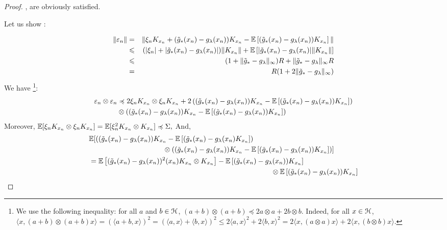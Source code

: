 \begin{proof}
,  are obviously satisfied.

Let us show :

\begin{eqnarray*}
\|\varepsilon_n\| &=& \| \xi_n K_{x_n}   +   (\tilde{g}_*(x_n)- g_\lambda(x_n)) K_{x_n} - {\mathbb E} \left[ (\tilde{g}_*(x_n)- g_\lambda(x_n)) K_{x_n} \right] \| \\
&\leqslant& (|\xi_n| + |\tilde{g}_*(x_n)- g_\lambda(x_n)|) \|K_{x_n} \|+  {\mathbb E} \left[ |\tilde{g}_*(x_n)- g_\lambda(x_n)| \|K_{x_n}\| \right]\\
&\leqslant& (1+\|\tilde{g}_*- g_\lambda\|_\infty) R +  \|\tilde{g}_*- g_\lambda\|_\infty R  \\
&=& R(1+2 \|\tilde{g}_*- g_\lambda\|_\infty) 
\end{eqnarray*}
We have \footnote{We use the following inequality: for all $a$ and $b \in {\mathcal H}$, $(a+b) \otimes (a+b) \preccurlyeq 2 a \otimes a + 2 b \otimes b$. Indeed, for all $x \in {\mathcal H}$, $\langle x, (a+b) \otimes (a+b) x\rangle  =  (\langle a +  b , x\rangle)^2 = (\langle a,x\rangle +  \langle b , x\rangle)^2 \leqslant 2 \langle a,x \rangle^2 + 2 \langle b , x \rangle^2 = 2 \langle x, (a \otimes a) x \rangle + 2 \langle x, (b \otimes b) x \rangle $.}:
\begin{align*}
\varepsilon_n \otimes \varepsilon_n  &\preccurlyeq  2 \xi_n K_{x_n} \otimes \xi_n K_{x_n} +  2\left((\tilde{g}_*(x_n)- g_\lambda(x_n)) K_{x_n} - {\mathbb E} \left[ (\tilde{g}_*(x_n)- g_\lambda(x_n)) K_{x_n} \right]\right)   \\ 
& \otimes \left((\tilde{g}_*(x_n)- g_\lambda(x_n)) K_{x_n} - {\mathbb E} \left[ (\tilde{g}_*(x_n)- g_\lambda(x_n)) K_{x_n} \right]\right)
\end{align*}
Moreover, ${\mathbb E} [\xi_n K_{x_n} \otimes \xi_n K_{x_n}] = {\mathbb E} [\xi_n^2 K_{x_n} \otimes K_{x_n}] \preccurlyeq \Sigma ,$
And,
\begin{align*}
& \E[((\Phg(x_n)- g_\lambda(x_n) )K_{x_n} - \E \left[ (\Phg(x_n)- g_\lambda(x_n) K_{x_n} \right]) \\
& \hspace{3.66cm}\otimes ((\Phg(x_n)- g_\lambda(x_n)) K_{x_n} - \E \left[ (\Phg(x_n)- g_\lambda(x_n)) K_{x_n} \right])] \\
&= \E \left[ (\Phg(x_n)- g_\lambda(x_n))^2(x_n) K_{x_n} \otimes K_{x_n} \right] - \E \left[ (\Phg(x_n)- g_\lambda(x_n)) K_{x_n} \right] \\
& \hspace{9cm} \otimes \E \left[ (\Phg(x_n)- g_\lambda(x_n)) K_{x_n} \right] \\

\end{align*}
\end{proof}

